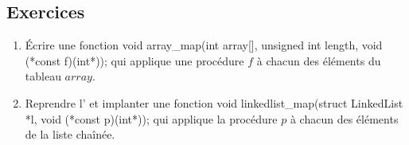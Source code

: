 \documentclass[../../../main.tex]{subfiles}
\begin{document}
\subsection{Exercices}
\begin{enumerate}
	\item Écrire une fonction \textsf{void array\_map(int array[], unsigned int length, void (*const f)(int*));} qui applique une procédure $f$ à chacun des éléments du tableau $array$.
	\item Reprendre l' et implanter une fonction \textsf{void linkedlist\_map(struct LinkedList *l, void (*const p)(int*));} qui applique la procédure $p$ à chacun des éléments de la liste chaînée.
\end{enumerate}
\end{document}
